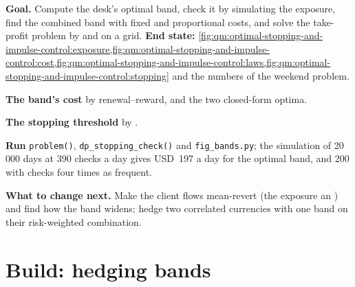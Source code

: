 \begin{tutorial}
\textbf{Goal.} Compute the desk's optimal band, check it by simulating the exposure, find the combined band with fixed and
proportional costs, and solve the take-profit problem by  and on a grid. \textbf{End state:}
\cref{fig:qm:optimal-stopping-and-impulse-control:exposure,fig:qm:optimal-stopping-and-impulse-control:cost,fig:qm:optimal-stopping-and-impulse-control:laws,fig:qm:optimal-stopping-and-impulse-control:stopping}
and the numbers of the weekend problem.
\begin{tutsteps}
\item \textbf{The band's cost} by renewal--reward, and the two closed-form optima.
\label{lst:qm:optimal-stopping-and-impulse-control:band}
\item \textbf{The stopping threshold} by .
\label{lst:qm:optimal-stopping-and-impulse-control:stop}
\item \textbf{Run} \texttt{problem()}, \texttt{dp\_stopping\_check()} and \texttt{fig\_bands.py}; the simulation of 20\,000 days at
390 checks a day gives USD~197 a day for the optimal band, and 200 with checks four times as frequent.
\end{tutsteps}
\textbf{What to change next.} Make the client flows mean-revert (the exposure an ) and find how the band
widens; hedge two correlated currencies with one band on their risk-weighted combination.
\end{tutorial}

\section{Build: hedging bands}\label{bld:qm:optimal-stopping-and-impulse-control:impulse}

